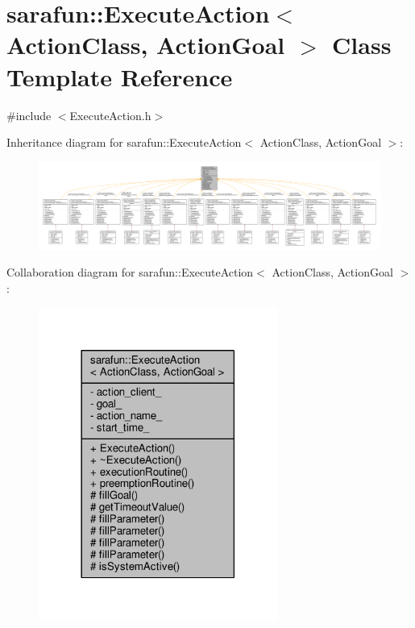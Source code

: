 \hypertarget{classsarafun_1_1ExecuteAction}{\section{sarafun\-:\-:Execute\-Action$<$ Action\-Class, Action\-Goal $>$ Class Template Reference}
\label{classsarafun_1_1ExecuteAction}
}


{\ttfamily \#include $<$Execute\-Action.\-h$>$}



Inheritance diagram for sarafun\-:\-:Execute\-Action$<$ Action\-Class, Action\-Goal $>$\-:
\nopagebreak
\begin{figure}[H]
\begin{center}
\leavevmode
\includegraphics[width=350pt]{db/d30/classsarafun_1_1ExecuteAction__inherit__graph}
\end{center}
\end{figure}


Collaboration diagram for sarafun\-:\-:Execute\-Action$<$ Action\-Class, Action\-Goal $>$\-:\nopagebreak
\begin{figure}[H]
\begin{center}
\leavevmode
\includegraphics[width=222pt]{de/dc6/classsarafun_1_1ExecuteAction__coll__graph}
\end{center}
\end{figure}
